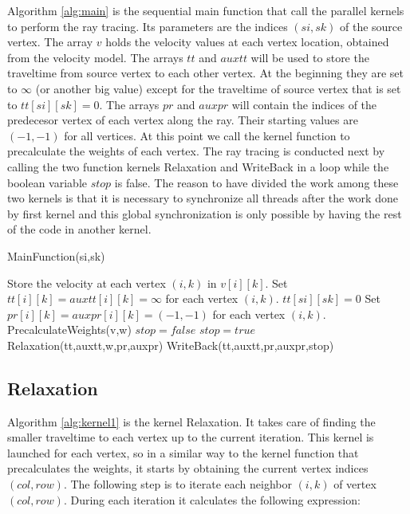 Algorithm \ref{alg:main} is the sequential main function that
call the parallel kernels to perform the ray tracing. Its
parameters are the indices $(si,sk)$ of the source vertex.
The array $v$ holds the velocity values at each vertex location,
obtained from the velocity model.
The arrays $tt$ and $auxtt$ will be used to store the traveltime
from source vertex to each other vertex. At the beginning they
are set to
$\infty$ (or another big value) except for the traveltime
of source vertex that is set to $tt[si][sk]=0$. The arrays
$pr$ and $auxpr$ will contain the indices of the predecesor
vertex of each vertex along the ray. Their starting values
are $(-1,-1)$ for all vertices. At this point we call the kernel function to 
precalculate the weights of each vertex. The ray tracing is 
conducted next by calling the two function kernels Relaxation and 
WriteBack in a loop while the boolean variable $stop$ is false.
The reason to have divided the work among these two kernels is that
it is necessary to synchronize all threads after the work done by
first kernel and this global synchronization is only possible by
having the rest of the code in another kernel.

\begin{algorithm}
 \caption{MainFunction(si,sk)}
 \label{alg:main}
 \begin{algorithmic}[1]
  \STATE Store the velocity at each vertex $(i,k)$ in $v[i][k]$.
  \STATE Set $tt[i][k] = auxtt[i][k] = \infty$ for each vertex $(i,k)$.
  \STATE $tt[si][sk] = 0$
  \STATE Set $pr[i][k] = auxpr[i][k] = (-1,-1)$ for each vertex $(i,k)$.
  \STATE PrecalculateWeights(v,w)
  \STATE $stop = false$
    \STATE $stop = true$
    \STATE Relaxation(tt,auxtt,w,pr,auxpr)
    \STATE WriteBack(tt,auxtt,pr,auxpr,stop)
  \ENDWHILE
 \end{algorithmic}
\end{algorithm}

\subsection*{Relaxation}

Algorithm \ref{alg:kernel1} is the kernel Relaxation. It takes
care of finding the smaller traveltime to
each vertex up to the current iteration. This kernel is 
launched for each vertex, so in a similar way to the kernel
function that precalculates the weights, it starts by obtaining
the current vertex indices $(col,row)$. The following step is
to iterate each neighbor $(i,k)$ of vertex $(col,row)$. During
each iteration it calculates the following expression:


